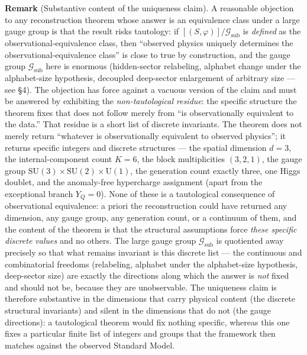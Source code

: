 \documentclass[
]{article}
\begin{document}
\textbf{Remark} (Substantive content of the uniqueness claim). A
reasonable objection to any reconstruction theorem whose answer is an
equivalence class under a large gauge group is that the result risks
tautology: if \([(S,\varphi)]/\mathcal{G}_{\text{sub}}\) is
\emph{defined} as the observational-equivalence class, then ``observed
physics uniquely determines the observational-equivalence class'' is
close to true by construction, and the gauge group
\(\mathcal{G}_{\text{sub}}\) here is enormous (hidden-sector relabeling,
alphabet change under the alphabet-size hypothesis, decoupled
deep-sector enlargement of arbitrary size --- see §4). The objection has
force against a vacuous version of the claim and must be answered by
exhibiting the \emph{non-tautological residue}: the specific structure
the theorem fixes that does not follow merely from ``is observationally
equivalent to the data.'' That residue is a short list of discrete
invariants. The theorem does not merely return ``whatever is
observationally equivalent to observed physics''; it returns specific
integers and discrete structures --- the spatial dimension \(d = 3\),
the internal-component count \(K = 6\), the block multiplicities
\((3,2,1)\), the gauge group
\(\mathrm{SU}(3)\times\mathrm{SU}(2)\times\mathrm{U}(1)\), the
generation count exactly three, one Higgs doublet, and the anomaly-free
hypercharge assignment (apart from the exceptional branch \(Y_Q=0\)).
None of these is a tautological consequence of observational
equivalence: a priori the reconstruction could have returned any
dimension, any gauge group, any generation count, or a continuum of
them, and the content of the theorem is that the structural assumptions
force \emph{these specific discrete values} and no others. The large
gauge group \(\mathcal{G}_{\text{sub}}\) is quotiented away precisely so
that what remains invariant is this discrete list --- the continuous and
combinatorial freedoms (relabeling, alphabet under the alphabet-size
hypothesis, deep-sector size) are exactly the directions along which the
answer is \emph{not} fixed and should not be, because they are
unobservable. The uniqueness claim is therefore substantive in the
dimensions that carry physical content (the discrete structural
invariants) and silent in the dimensions that do not (the gauge
directions): a tautological theorem would fix nothing specific, whereas
this one fixes a particular finite list of integers and groups that the
framework then matches against the observed Standard Model.
\end{document}
